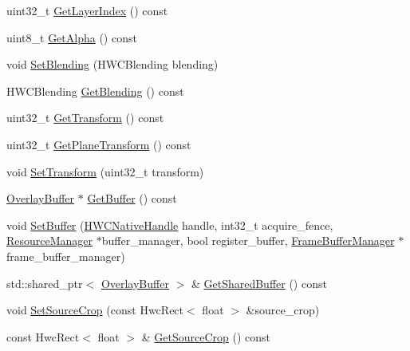 \begin{DoxyCompactItemize}
\item 
uint32\+\_\+t \mbox{\hyperlink{structhwcomposer_1_1OverlayLayer_a304dc3db03f830a42cca4fd9163333a1}{Get\+Layer\+Index}} () const
\item 
uint8\+\_\+t \mbox{\hyperlink{structhwcomposer_1_1OverlayLayer_ac6a5eac7bd702ec0bafbfab46f96242c}{Get\+Alpha}} () const
\item 
void \mbox{\hyperlink{structhwcomposer_1_1OverlayLayer_a15cf340482b76b2b15c75fc0184e5f00}{Set\+Blending}} (H\+W\+C\+Blending blending)
\item 
H\+W\+C\+Blending \mbox{\hyperlink{structhwcomposer_1_1OverlayLayer_ad6248ab09bcb8be3747806bfe18f3822}{Get\+Blending}} () const
\item 
uint32\+\_\+t \mbox{\hyperlink{structhwcomposer_1_1OverlayLayer_a4561204c8e092b5e37d8222c431c296c}{Get\+Transform}} () const
\item 
uint32\+\_\+t \mbox{\hyperlink{structhwcomposer_1_1OverlayLayer_ada71243f601d3f5c1c7a762334392d0d}{Get\+Plane\+Transform}} () const
\item 
void \mbox{\hyperlink{structhwcomposer_1_1OverlayLayer_a531c1e127f6f5d5ea7df1eb438f116fc}{Set\+Transform}} (uint32\+\_\+t transform)
\item 
\mbox{\hyperlink{classhwcomposer_1_1OverlayBuffer}{Overlay\+Buffer}} $\ast$ \mbox{\hyperlink{structhwcomposer_1_1OverlayLayer_a92e6edaec1053b6a2c015fe3f7c400c0}{Get\+Buffer}} () const
\item 
void \mbox{\hyperlink{structhwcomposer_1_1OverlayLayer_a48fe87ac79da0d09f4bc6de5057de445}{Set\+Buffer}} (\mbox{\hyperlink{alios_2platformdefines_8h_ac0a2eaf260f556d17fe489911f017bdf}{H\+W\+C\+Native\+Handle}} handle, int32\+\_\+t acquire\+\_\+fence, \mbox{\hyperlink{classhwcomposer_1_1ResourceManager}{Resource\+Manager}} $\ast$buffer\+\_\+manager, bool register\+\_\+buffer, \mbox{\hyperlink{classhwcomposer_1_1FrameBufferManager}{Frame\+Buffer\+Manager}} $\ast$frame\+\_\+buffer\+\_\+manager)
\item 
std\+::shared\+\_\+ptr$<$ \mbox{\hyperlink{classhwcomposer_1_1OverlayBuffer}{Overlay\+Buffer}} $>$ \& \mbox{\hyperlink{structhwcomposer_1_1OverlayLayer_af2fa448d9a9d1f43eafa8765d27cab9b}{Get\+Shared\+Buffer}} () const
\item 
void \mbox{\hyperlink{structhwcomposer_1_1OverlayLayer_ab72c90d71d1cf45d90cd176c68b0a2e7}{Set\+Source\+Crop}} (const Hwc\+Rect$<$ float $>$ \&source\+\_\+crop)
\item 
const Hwc\+Rect$<$ float $>$ \& \mbox{\hyperlink{structhwcomposer_1_1OverlayLayer_a91d909615d951f362553303650e5d237}{Get\+Source\+Crop}} () const

\end{DoxyCompactItemize}
